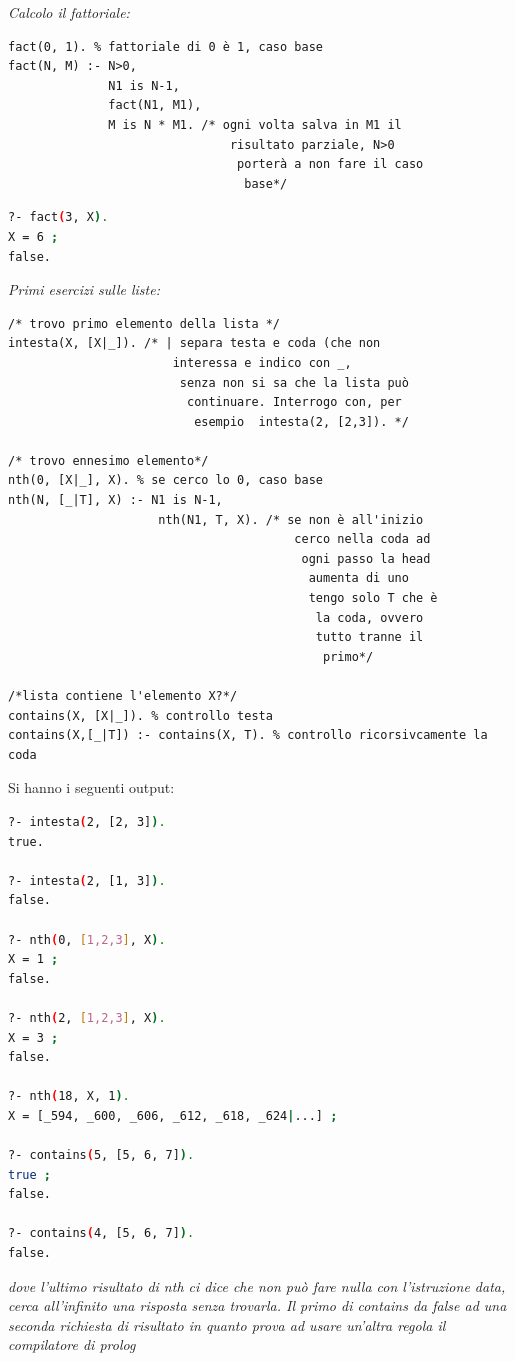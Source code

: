 \documentclass[a4paper,12pt, oneside]{book}
\begin{document}
\newpage
\begin{esercizio}
\textit{Calcolo il fattoriale:}
\begin{verbatim}
fact(0, 1). % fattoriale di 0 è 1, caso base
fact(N, M) :- N>0,
              N1 is N-1,
              fact(N1, M1),
              M is N * M1. /* ogni volta salva in M1 il       
                               risultato parziale, N>0 
                                porterà a non fare il caso 
                                 base*/

\end{verbatim}
\begin{lstlisting}[language=bash]
?- fact(3, X).
X = 6 ;
false.
\end{lstlisting}
\end{esercizio}
\begin{esercizio}
\textit{Primi esercizi sulle liste:}
\begin{verbatim}
/* trovo primo elemento della lista */
intesta(X, [X|_]). /* | separa testa e coda (che non
                       interessa e indico con _,
                        senza non si sa che la lista può
                         continuare. Interrogo con, per
                          esempio  intesta(2, [2,3]). */

/* trovo ennesimo elemento*/
nth(0, [X|_], X). % se cerco lo 0, caso base
nth(N, [_|T], X) :- N1 is N-1,
                     nth(N1, T, X). /* se non è all'inizio
                                        cerco nella coda ad
                                         ogni passo la head
                                          aumenta di uno
                                          tengo solo T che è
                                           la coda, ovvero
                                           tutto tranne il
                                            primo*/

/*lista contiene l'elemento X?*/
contains(X, [X|_]). % controllo testa
contains(X,[_|T]) :- contains(X, T). % controllo ricorsivcamente la coda
\end{verbatim}
\newpage
Si hanno i seguenti output:
\begin{shaded}
\begin{lstlisting}[language=bash]
?- intesta(2, [2, 3]).
true.

?- intesta(2, [1, 3]).
false.

?- nth(0, [1,2,3], X).
X = 1 ;
false.

?- nth(2, [1,2,3], X).
X = 3 ;
false.

?- nth(18, X, 1).
X = [_594, _600, _606, _612, _618, _624|...] ;

?- contains(5, [5, 6, 7]).
true ;
false.

?- contains(4, [5, 6, 7]).
false.
\end{lstlisting}
\textit{dove l'ultimo risultato di nth ci dice che non può fare nulla con l'istruzione data, cerca all'infinito una risposta senza trovarla. Il primo di contains da false ad una seconda richiesta di risultato in quanto prova ad usare un'altra regola il compilatore di prolog}
\end{shaded}
\end{esercizio}
\end{document}
